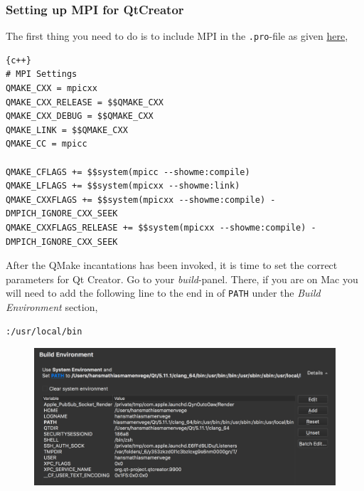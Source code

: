 \documentclass[11pt]{article}
\begin{document}
\subsubsection{Setting up MPI for QtCreator}
The first thing you need to do is to include MPI in the \texttt{.pro}-file as given \href{https://dragly.org/2012/03/14/developing-mpi-applications-in-qt-creator/}{here},
\begin{lstlisting}{c++}
# MPI Settings
QMAKE_CXX = mpicxx
QMAKE_CXX_RELEASE = $$QMAKE_CXX
QMAKE_CXX_DEBUG = $$QMAKE_CXX
QMAKE_LINK = $$QMAKE_CXX
QMAKE_CC = mpicc

QMAKE_CFLAGS += $$system(mpicc --showme:compile)
QMAKE_LFLAGS += $$system(mpicxx --showme:link)
QMAKE_CXXFLAGS += $$system(mpicxx --showme:compile) -DMPICH_IGNORE_CXX_SEEK
QMAKE_CXXFLAGS_RELEASE += $$system(mpicxx --showme:compile) -DMPICH_IGNORE_CXX_SEEK
\end{lstlisting}

After the QMake incantations has been invoked, it is time to set the correct parameters for Qt Creator. Go to your \textit{build}-panel. There, if you are on Mac you will need to add the following line to the end in of \texttt{PATH} under the \textit{Build Environment} section,
\begin{lstlisting}
:/usr/local/bin
\end{lstlisting}
\begin{figure}[H]
    \centering
    \includegraphics[width=\textwidth]{figures/mpi/mpi_build_envoirement.png}
\end{figure}
\end{document}
